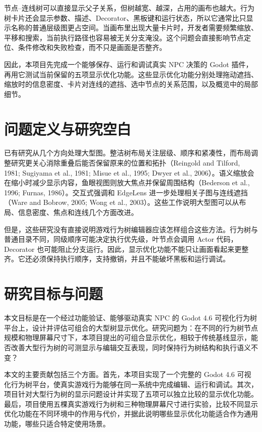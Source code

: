 \documentclass[11pt,a4paper,oneside,extrafontsizes]{memoir}
\begin{document}
节点–连线树可以直接显示父子关系，但树越宽、越深，占用的画布也越大。行为树卡片还会显示参数、描述、Decorator、黑板键和运行状态，所以它通常比只显示名称的普通层级图更占空间。当画布里出现大量卡片时，开发者需要频繁缩放、平移和搜索，当前执行路径也容易被无关分支淹没。这个问题会直接影响节点定位、条件修改和失败检查，而不只是画面是否整齐。

因此，本项目先完成一个能够保存、运行和调试真实 NPC 决策的 Godot 插件，再用它测试当前保留的五项显示优化功能。这些显示优化功能分别处理拖动遮挡、缩放时的信息密度、卡片对连线的遮挡、选中节点的关系范围，以及概览中的局部细节。

\section{问题定义与研究空白}

已有研究从几个方向处理大型图。整洁树布局关注层级、顺序和紧凑性，而布局调整研究更关心消除重叠后能否保留原来的位置和拓扑（Reingold and Tilford, 1981; Sugiyama et al., 1981; Misue et al., 1995; Dwyer et al., 2006）。语义缩放会在缩小时减少显示内容，鱼眼视图则放大焦点并保留周围结构（Bederson et al., 1996; Furnas, 1986）。交互式强调和 EdgeLens 进一步处理相关子图与连线遮挡（Ware and Bobrow, 2005; Wong et al., 2003）。这些工作说明大型图可以从布局、信息密度、焦点和连线几个方面改进。

但是，这些研究没有直接说明游戏行为树编辑器应该怎样组合这些方法。行为树与普通目录不同，同级顺序可能决定执行优先级，叶节点会调用 Actor 代码，Decorator 也可能阻止分支运行。因此，显示优化功能不能只让画面看起来更整齐。它还必须保持执行顺序，支持撤销，并且不能破坏黑板和运行调试。

\section{研究目标与问题}

本文目标是在一个经过功能验证、能够驱动真实 NPC 的 Godot 4.6 可视化行为树平台上，设计并评估可组合的大型树显示优化。研究问题为：在不同的行为树节点规模和物理屏幕尺寸下，本项目提出的可组合显示优化，相较于传统基线显示，能否改善大型行为树的可测显示与编辑交互表现，同时保持行为树结构和执行语义不变？

本文的主要贡献包括三个方面。首先，本项目实现了一个完整的 Godot 4.6 可视化行为树平台，使真实游戏行为能够在同一系统中完成编辑、运行和调试。其次，项目针对大型行为树的显示问题设计并实现了五项可以独立比较的显示优化功能。最后，项目使用五棵真实游戏行为树和三种物理屏幕尺寸进行实验，比较不同显示优化功能在不同环境中的作用与代价，并据此说明哪些显示优化功能适合作为通用功能，哪些只适合特定使用场景。
\end{document}
